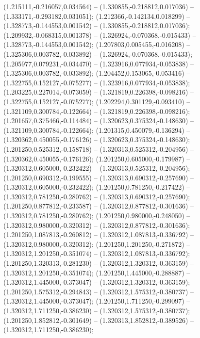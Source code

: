  (1.215111,-0.216057,0.034564) -- (1.330855,-0.218812,0.017036) -- (1.333171,-0.293182,0.031051);
 (1.212366,-0.142134,0.018299) -- (1.328773,-0.144553,0.001542) -- (1.330855,-0.218812,0.017036);
 (1.209932,-0.068315,0.001378) -- (1.326924,-0.070368,-0.015433) -- (1.328773,-0.144553,0.001542);
 (1.207803,0.005455,-0.016208) -- (1.325306,0.003782,-0.033892) -- (1.326924,-0.070368,-0.015433);
 (1.205977,0.079231,-0.034470) -- (1.323916,0.077934,-0.053838) -- (1.325306,0.003782,-0.033892);
 (1.204452,0.153065,-0.053416) -- (1.322755,0.152127,-0.075277) -- (1.323916,0.077934,-0.053838);
 (1.203225,0.227014,-0.073059) -- (1.321819,0.226398,-0.098216) -- (1.322755,0.152127,-0.075277);
 (1.202294,0.301129,-0.093410) -- (1.321109,0.300784,-0.122664) -- (1.321819,0.226398,-0.098216);
 (1.201657,0.375466,-0.114484) -- (1.320623,0.375324,-0.148630) -- (1.321109,0.300784,-0.122664);
 (1.201315,0.450079,-0.136294) -- (1.320362,0.450055,-0.176126) -- (1.320623,0.375324,-0.148630);
 (1.201250,0.525312,-0.158718) -- (1.320313,0.525312,-0.204956) -- (1.320362,0.450055,-0.176126);
 (1.201250,0.605000,-0.179987) -- (1.320312,0.605000,-0.232422) -- (1.320313,0.525312,-0.204956);
 (1.201250,0.690312,-0.199555) -- (1.320313,0.690312,-0.257690) -- (1.320312,0.605000,-0.232422);
 (1.201250,0.781250,-0.217422) -- (1.320312,0.781250,-0.280762) -- (1.320313,0.690312,-0.257690);
 (1.201250,0.877812,-0.233587) -- (1.320312,0.877812,-0.301636) -- (1.320312,0.781250,-0.280762);
 (1.201250,0.980000,-0.248050) -- (1.320312,0.980000,-0.320312) -- (1.320312,0.877812,-0.301636);
 (1.201250,1.087813,-0.260812) -- (1.320312,1.087813,-0.336792) -- (1.320312,0.980000,-0.320312);
 (1.201250,1.201250,-0.271872) -- (1.320312,1.201250,-0.351074) -- (1.320312,1.087813,-0.336792);
 (1.201250,1.320313,-0.281230) -- (1.320312,1.320312,-0.363159) -- (1.320312,1.201250,-0.351074);
 (1.201250,1.445000,-0.288887) -- (1.320312,1.445000,-0.373047) -- (1.320312,1.320312,-0.363159);
 (1.201250,1.575312,-0.294843) -- (1.320312,1.575312,-0.380737) -- (1.320312,1.445000,-0.373047);
 (1.201250,1.711250,-0.299097) -- (1.320312,1.711250,-0.386230) -- (1.320312,1.575312,-0.380737);
 (1.201250,1.852812,-0.301649) -- (1.320313,1.852812,-0.389526) -- (1.320312,1.711250,-0.386230);
